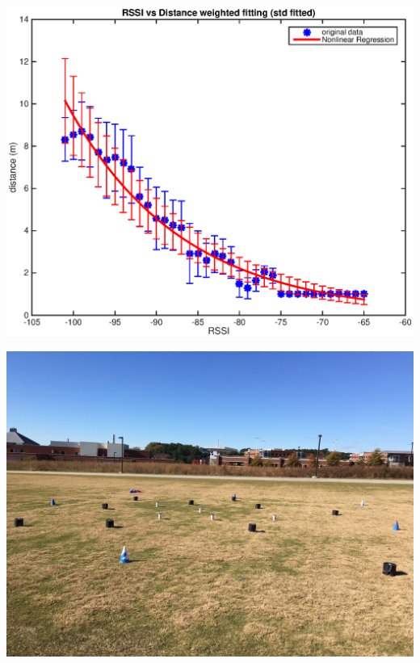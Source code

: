 \documentclass[11pt]{beamer}
\begin{document}
\begin{frame}
\includegraphics[width=\textwidth]{outdoor_rssi_dis_weighted_std_fitting.eps} 
\end{frame}

\begin{frame}
\includegraphics[width=\textwidth]{grass_wolfbot_setup.jpg} 
\end{frame}
\end{document}
